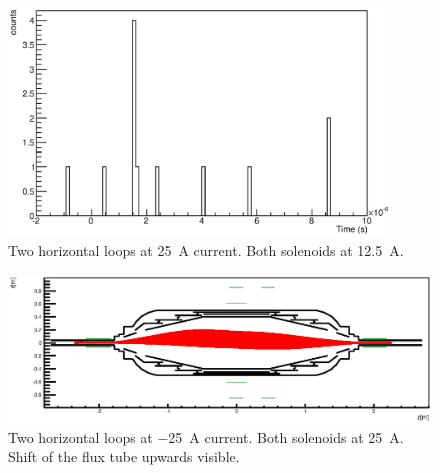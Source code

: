 \begin{figure}
\centering
	\includegraphics[width = 0.9\textwidth]{graphics/analysis/monSpec/NC.eps}
	\caption[\SI{25}{\ampere} loops]{Two horizontal loops at \SI{25}{\ampere} current. Both solenoids at \SI{12.5}{\ampere}.}
	\label{fig:NC}
\end{figure}
\clearpage








\begin{figure}
\centering
	\centerline{\includegraphics[width = 1.3\linewidth]{graphics/analysis/monSpec/fieldSimulation/ND.eps} }
	
	\caption[\SI{50}{\ampere} loops]{Two horizontal loops at \SI{-25}{\ampere} current. Both solenoids at \SI{25}{\ampere}. Shift of the flux tube upwards visible. }
	\label{fig:NDf}
\end{figure}

